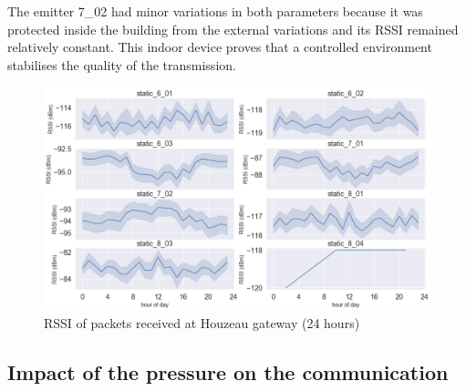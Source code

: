 \documentclass[letterpaper, 10 pt, conference]{ieeeconf}  %
\begin{document}
The emitter 7\_02 had minor variations in both parameters because it was protected inside the building from the external variations and its RSSI remained relatively constant. This indoor device proves that a controlled environment stabilises the quality of the transmission.

\begin{figure}[htbp]
\centering
\includegraphics[scale=0.245]{rssi_all_24h.png}
\caption{RSSI of packets received at Houzeau gateway (24 hours)}
\label{rssi_all_24}
\end{figure}






\subsection{Impact of the pressure on the communication}
\end{document}
